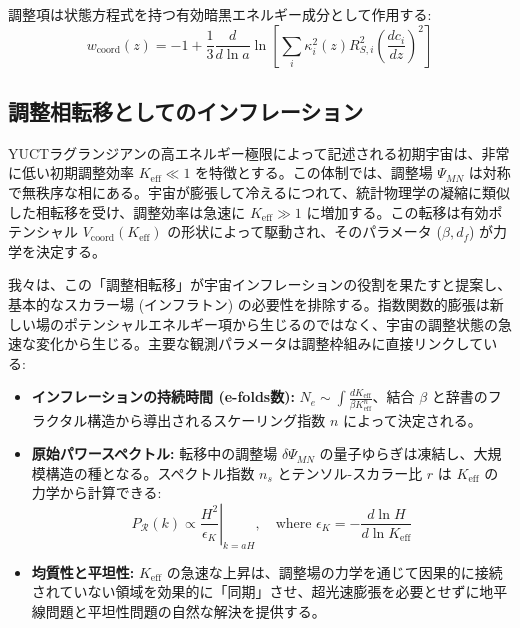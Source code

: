 \documentclass[11pt,a4paper]{article}
\begin{document}
	調整項は状態方程式を持つ有効暗黒エネルギー成分として作用する:
	\begin{equation}
		w_{\text{coord}}(z) = -1 + \frac{1}{3} \frac{d}{d\ln a} \ln \left[ \sum_i \kappa_i^2(z) R_{S,i}^2 \left(\frac{dc_i}{dz}\right)^2 \right]
	\end{equation}
	
	\subsection{調整相転移としてのインフレーション}
	\label{subsec:inflation-transition}
	
	YUCTラグランジアンの高エネルギー極限によって記述される初期宇宙は、非常に低い初期調整効率 $K_{\mathrm{eff}} \ll 1$ を特徴とする。この体制では、調整場 $\Psi_{MN}$ は対称で無秩序な相にある。宇宙が膨張して冷えるにつれて、統計物理学の凝縮に類似した相転移を受け、調整効率は急速に $K_{\mathrm{eff}} \gg 1$ に増加する。この転移は有効ポテンシャル $V_{\mathrm{coord}}(K_{\mathrm{eff}})$ の形状によって駆動され、そのパラメータ ($\beta, d_f$) が力学を決定する。
	
	我々は、この「調整相転移」が宇宙インフレーションの役割を果たすと提案し、基本的なスカラー場 (インフラトン) の必要性を排除する。指数関数的膨張は新しい場のポテンシャルエネルギー項から生じるのではなく、宇宙の調整状態の急速な変化から生じる。主要な観測パラメータは調整枠組みに直接リンクしている:
	
	\begin{itemize}
		\item \textbf{インフレーションの持続時間 (e-folds数):} \(N_e \sim \int \frac{dK_{\mathrm{eff}}}{\beta K_{\mathrm{eff}}^n} \)、結合 \(\beta\) と辞書のフラクタル構造から導出されるスケーリング指数 \(n\) によって決定される。
		\item \textbf{原始パワースペクトル:} 転移中の調整場 \(\delta \Psi_{MN}\) の量子ゆらぎは凍結し、大規模構造の種となる。スペクトル指数 \(n_s\) とテンソル-スカラー比 \(r\) は \(K_{\mathrm{eff}}\) の力学から計算できる:
		\begin{equation}
			P_{\mathcal{R}}(k) \propto \left. \frac{H^2}{\epsilon_K} \right|_{k=aH}, \quad \text{where } \epsilon_K = -\frac{d\ln H}{d\ln K_{\mathrm{eff}}}
		\end{equation}
		\item \textbf{均質性と平坦性:} \(K_{\mathrm{eff}}\) の急速な上昇は、調整場の力学を通じて因果的に接続されていない領域を効果的に「同期」させ、超光速膨張を必要とせずに地平線問題と平坦性問題の自然な解決を提供する。
	\end{itemize}
	
\end{document}
